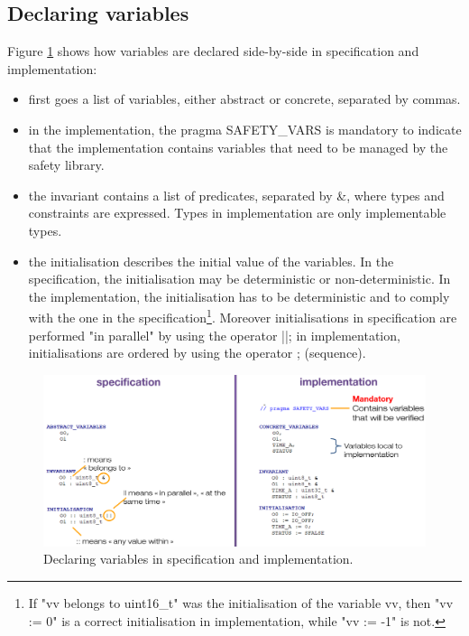 \subsection{Declaring variables}

Figure \ref{programming:var-decl} shows how variables are declared side-by-side in specification and implementation:
\begin{itemize}
    \item first goes a list of variables, either abstract or concrete, separated by commas.
    \item in the implementation, the pragma SAFETY\_VARS is mandatory to indicate that the implementation contains variables that need to be managed by the safety library.
    \item the invariant contains a list of predicates, separated by \&, where types and constraints are expressed. Types in implementation are only implementable types.
    \item the initialisation describes the initial value of the variables. In the specification, the initialisation may be deterministic or non-deterministic. In the implementation, the initialisation has to be deterministic and to comply with the one in the specification\footnote{If "vv belongs to uint16\_t" was the initialisation of the variable vv, then "vv := 0" is a correct initialisation in implementation, while "vv := -1" is not.}. Moreover initialisations in specification are performed "in parallel" by using the operator ||; in implementation, initialisations are ordered by using the operator ; (sequence).
\end{itemize}
\begin{figure}[ht]
\centering\includegraphics[scale=0.25]{Pictures/chapterProgramming/variables-decl.png}
\caption{Declaring variables in specification and implementation.}
\label{programming:var-decl}
\end{figure}  

